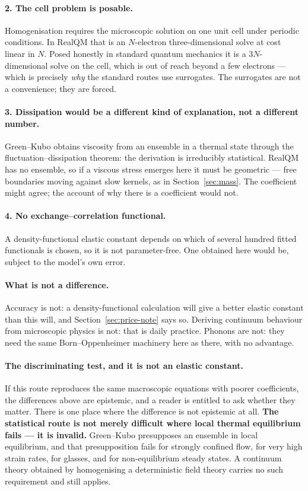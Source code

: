\documentclass[11pt]{article}
\begin{document}
\paragraph{2. The cell problem is posable.} Homogenisation requires the microscopic solution on one
unit cell under periodic conditions. In RealQM that is an $N$-electron three-dimensional solve at
cost linear in $N$. Posed honestly in standard quantum mechanics it is a $3N$-dimensional solve on
the cell, which is out of reach beyond a few electrons --- which is precisely \emph{why} the
standard routes use surrogates. The surrogates are not a convenience; they are forced.

\paragraph{3. Dissipation would be a different kind of explanation, not a different number.}
Green--Kubo obtains viscosity from an ensemble in a thermal state through the
fluctuation--dissipation theorem: the derivation is irreducibly statistical. RealQM has no ensemble,
so if a viscous stress emerges here it must be geometric --- free boundaries moving against slow
kernels, as in Section~\ref{sec:mass}. The coefficient might agree; the account of why there is a
coefficient would not.

\paragraph{4. No exchange--correlation functional.} A density-functional elastic constant depends on
which of several hundred fitted functionals is chosen, so it is not parameter-free. One obtained
here would be, subject to the model's own error.

\paragraph{What is not a difference.} Accuracy is not: a density-functional calculation will give a
better elastic constant than this will, and Section~\ref{sec:price-note} says so. Deriving continuum
behaviour from microscopic physics is not: that is daily practice. Phonons are not: they need the
same Born--Oppenheimer machinery here as there, with no advantage.

\paragraph{The discriminating test, and it is not an elastic constant.} If this route reproduces the
same macroscopic equations with poorer coefficients, the differences above are epistemic, and a
reader is entitled to ask whether they matter. There is one place where the difference is not
epistemic at all. \textbf{The statistical route is not merely difficult where local thermal
equilibrium fails --- it is invalid.} Green--Kubo presupposes an ensemble in local equilibrium, and
that presupposition fails for strongly confined flow, for very high strain rates, for glasses, and
for non-equilibrium steady states. A continuum theory obtained by homogenising a deterministic
field theory carries no such requirement and still applies.
\end{document}
